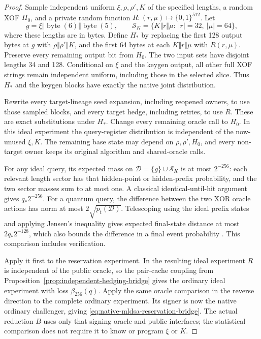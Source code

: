 \begin{proof}
Sample independent uniform $\xi,\rho,\rho',K$ of the specified lengths,
a random XOF $H_0$, and a private random function
$R:(r,\mu)\mapsto\{0,1\}^{512}$. Let
\[
 g=\xi\Vert\operatorname{byte}(6)\Vert\operatorname{byte}(5),\qquad
 \mathcal S_K=\{K\Vert r\Vert\mu:\ |r|=32,\ |\mu|=64\},
\]
where these lengths are in bytes. Define $H_*$ by replacing the first
128 output bytes at $g$ with $\rho\Vert\rho'\Vert K$, and the first
64 bytes at each $K\Vert r\Vert\mu$ with $R(r,\mu)$. Preserve every
remaining output bit from $H_0$. The two input sets have disjoint lengths
34 and 128. Conditional on $\xi$ and the keygen output, all other full XOF strings
remain independent uniform, including those in the selected slice.
Thus $H_*$ and the keygen blocks have exactly the native joint distribution.

Rewrite every target-lineage seed expansion, including reopened owners,
to use those sampled blocks, and every target hedge, including retries,
to use $R$. These are exact substitutions under $H_*$. Change every
remaining oracle call to $H_0$. In this ideal experiment the query-register
distribution is independent of the now-unused $\xi,K$. The remaining
base state may depend on $\rho,\rho',H_0$, and every non-target owner keeps
its original algorithm and shared-oracle calls.

For any ideal query, its expected mass on
$\mathcal D=\{g\}\cup\mathcal S_K$ is at most $2^{-256}$: each relevant
length sector has that hidden-point or hidden-prefix probability, and the
two sector masses sum to at most one. A classical identical-until-hit
argument gives $q_*2^{-256}$. For a quantum query, the difference between
the two XOR oracle actions has norm at most $2\sqrt{p_t(\mathcal D)}$.
Telescoping using the ideal prefix states and applying Jensen's inequality
gives expected final-state distance at most $2q_*2^{-128}$, which also
bounds the difference in a final event probability
\cite{bennett1997strengths}. This comparison includes verification.

Apply it first to the reservation experiment. In the resulting ideal
experiment $R$ is independent of the public oracle, so the pair-cache
coupling from Proposition~\ref{prop:independent-hedging-bridge} gives the
ordinary ideal experiment with loss $\beta_{256}(q)$. Apply the same
oracle comparison in the reverse direction to the complete ordinary
experiment. Its signer is now the native ordinary challenger, giving
\eqref{eq:native-mldsa-reservation-bridge}. The actual reduction $B$ uses
only that signing oracle and public interfaces; the statistical comparison
does not require it to know or program $\xi$ or $K$.
\end{proof}

